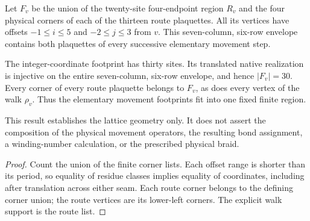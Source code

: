 \begin{definition}
    \label{def:peps_torus_swept_physical_route_footprint}
    \leanok
    Let $F_v$ be the union of the twenty-site four-endpoint region $R_v$
    and the four physical corners of each of the thirteen route plaquettes.
    All its vertices have offsets
    $-1\leq i\leq5$ and $-2\leq j\leq3$ from $v$.
    This seven-column, six-row envelope contains both plaquettes of every
    successive elementary movement step.
\end{definition}

\begin{lemma}
    \label{thm:peps_torus_swept_physical_route_footprint}
    \leanok
    The integer-coordinate footprint has thirty sites. Its translated native
    realization is injective on the entire seven-column, six-row envelope,
    and hence $|F_v|=30$. Every corner of every route plaquette belongs to
    $F_v$, as does every vertex of the walk $\rho_v$.
    Thus the elementary movement footprints fit into one fixed finite region.

    This result establishes the lattice geometry only. It does not assert the composition
    of the physical movement operators, the resulting bond assignment,
    a winding-number calculation, or the prescribed physical braid.
\end{lemma}
\begin{proof}\leanok
    Count the union of the finite corner lists. Each offset range is shorter
    than its period, so equality of residue classes implies equality of
    coordinates, including after translation across either seam.
    Each route corner belongs to the defining corner union; the route vertices
    are its lower-left corners. The explicit walk support is the route list.
\end{proof}
